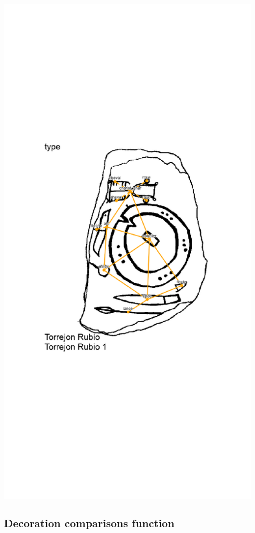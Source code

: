 \documentclass[article]{jss}
\begin{document}
\includegraphics{article_rvTH12-plotcm}

\subsection{Decoration comparisons function} \label{sec:functions_one}
\end{document}
